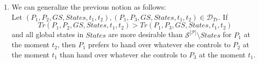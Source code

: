 \begin{enumerate}
    \item We can generalize the previous notion as follows: \\ Let $\left(P_1, P_2, GS, States, t_1, t_2\right), \left(P_1,
    P_3, GS, States, t_1, t_2\right) \in \mathcal{D}_{Tr}$. If
    \begin{equation*}
      Tr\left(P_1, P_2, GS, States, t_1, t_2\right) > Tr\left(P_1, P_3, GS, States, t_1, t_2\right)
    \end{equation*}
    and all global states in $States$ are more desirable than $\mathcal{S}^{|\mathcal{P}|} \setminus States$ for $P_1$ at
    the moment $t_2$, then $P_1$ prefers to hand over whatever she controls to $P_2$ at the moment $t_1$ than hand over
    whatever she controls to $P_3$ at the moment $t_1$.
  \end{enumerate}
